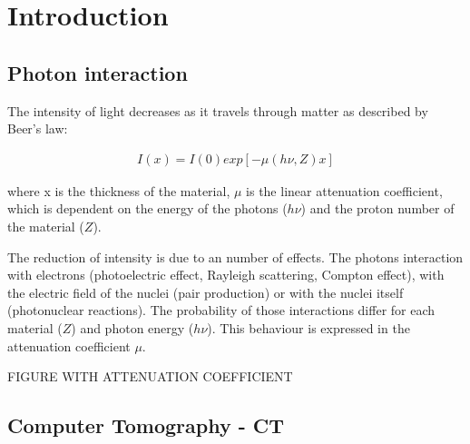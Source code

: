 \chapter{Introduction}
\label{chap:intro}

\section{Photon interaction}
\label{sec:photon}
The intensity of light decreases as it travels through matter as described by Beer's law:

\begin{align}
I(x) = I(0) exp[-\mu(h\nu,Z)x]
\end{align}

where x is the thickness of the material,
$\mu$ is the linear attenuation coefficient, which is dependent on the energy of the photons ($h\nu$) and the proton number of the material ($Z$).

The reduction of intensity is due to an number of effects. The photons interaction with electrons (photoelectric effect, Rayleigh scattering, Compton effect), with the electric field of the nuclei (pair production) or with the nuclei itself (photonuclear reactions). The probability of those interactions differ for each material ($Z$) and photon energy ($h\nu$). This behaviour is expressed in the attenuation coefficient $\mu$.


FIGURE WITH ATTENUATION COEFFICIENT


\section{Computer Tomography - CT}

